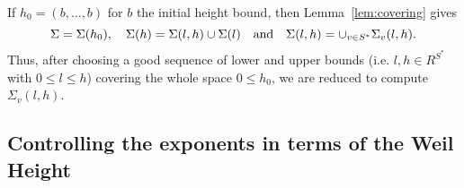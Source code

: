 If $h_0=(b,\dotsc,b)$ for $b$ the initial height bound, then
Lemma~\ref{lem:covering} gives  $$\Sigma=\Sigma(h_0), \quad \Sigma(h)=\Sigma(l,h)\cup \Sigma(l) \quad \textnormal{and} \quad \Sigma(l,h)=\cup_{v\in S^*}\Sigma_v(l,h).$$
Thus, after choosing a good sequence of lower and upper bounds (i.e. $l,h\in R^{S^*}$ with $0\leq l\leq h$) covering the whole space $0\leq h_0$, we are reduced to compute $\Sigma_v(l,h)$.
%
%
%
%
%
%
%

\subsection{Controlling the exponents in terms of the Weil Height}

